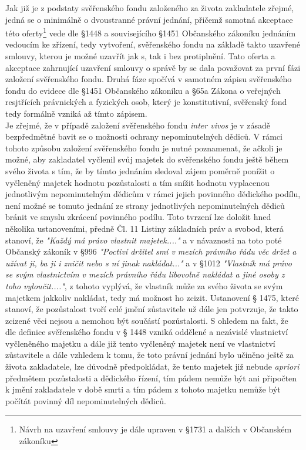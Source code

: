 \documentclass{article}
\begin{document}

Jak již je z podstaty svěřenského fondu založeného za života zakladatele zřejmé, jedná se o minimálně o dvoustranné právní jednání, přičemž samotná akceptace této oferty\footnote{Návrh na uzavření smlouvy je dále upraven v §1731 a dalších v Občanském zákoníku} vede dle §1448 a souvisejícího §1451 Občanského zákoníku jednáním vedoucím ke zřízení, tedy vytvoření, svěřenského fondu na základě takto uzavřené smlouvy, kterou je možné uzavřít jak s, tak i bez protiplnění. Tato oferta a akceptace zahrnující uzavření smlouvy o správě by se dala považovat za první fázi založení svěřenského fondu. Druhá fáze spočívá v samotném zápisu svěřenského fondu do evidece dle §1451 Občanského zákoníku a §65a Zákona o veřejných resjtřících právnických a fyzických osob, který je konstitutivní, svěřenský fond tedy formálně vzniká až tímto zápisem.\\

Je zřejmé, že v případě založení svěřenského fondu \textit{inter vivos} je v zásadě bezpředmětné bavit se o možnosti ochrany nepominutelných dědiců. V rámci tohoto způsobu založení svěřenského fondu je nutné poznamenat, že ačkoli je možné, aby zakladatel vyčlenil svůj majetek do svěřenského fondu ještě během svého života s tím, že by tímto jednáním sledoval zájem poměrně ponížit o vyčleněný majetek hodnotu pozůstalosti a tím snížit hodnotu vyplacenou jednotlivým nepominutelným dědicům v rámci jejich povinného dědického podílu, není možné se tomuto jednání ze strany jednotlivých nepominutelných dědiců bránit ve smyslu zkrácení povinného podílu. Toto tvrzení lze doložit hned několika ustanoveními, předně Čl. 11 Listiny základních práv a svobod, která stanoví, že \textit{"Každý má právo vlastnit majetek...."} a v návaznosti na toto poté Občanský zákoník v §996 \textit{"Poctiví držitel smí v mezích právního řádu věc držet a užívat ji, ba ji i zničit nebo s ní jinak nakládat..."} a v §1012 \textit{"Vlastník má právo se svým vlastnictvím v mezích právního řádu libovolně nakládat a jiné osoby z toho vyloučit...."}, z tohoto vyplývá, že vlastník může za svého života se svým majetkem jakkoliv nakládat, tedy má možnost ho zcizit. Ustanovení § 1475, které stanoví, že pozůstalost tvoří celé jmění zůstavitele už dále jen potvrzuje, že takto zcizené věci nejsou a nemohou být součástí pozůstalosti. S ohledem na fakt, že dle definice svěřenského fondu v § 1448 vzniká oddělené a nezávislé vlastnictví vyčleněného majetku a dále již tento vyčleněný majetek není ve vlastnictví zůstavitele a dále vzhledem k tomu, že toto právní jednání bylo učiněno ještě za života zakladatele, lze důvodně předpokládat, že tento majetek již nebude \textit{apriori} předmětem pozůstalosti a dědického řízení, tím pádem nemůže být ani připočten k jmění zakladatele v době smrti a tím pádem z tohoto majetku nemůže být počítát povinný díl nepominutelných dědiců.\\
\end{document}
